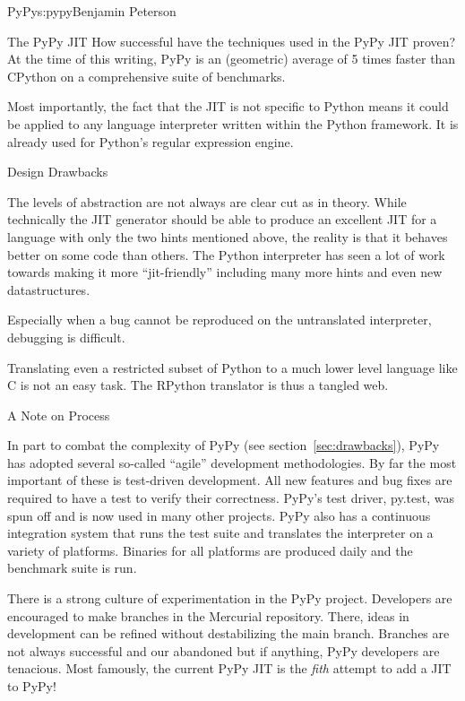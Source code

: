 \begin{aosachapter}{PyPy}{s:pypy}{Benjamin Peterson}
\begin{aosasect1}{The PyPy JIT}
How successful have the techniques used in the PyPy JIT proven? At the time of
this writing, PyPy is an (geometric) average of 5 times faster than CPython on a
comprehensive suite of benchmarks.

Most importantly, the fact that the JIT is not specific to Python means it could
be applied to any language interpreter written within the Python framework. It
is already used for Python's regular expression engine.

\end{aosasect1}

\begin{aosasect1}{Design Drawbacks}
\label{sec:drawbacks}

The levels of abstraction are not always are clear cut as in theory. While
technically the JIT generator should be able to produce an excellent JIT for a
language with only the two hints mentioned above, the reality is that it behaves
better on some code than others. The Python interpreter has seen a lot of work
towards making it more ``jit-friendly'' including many more hints and even new
datastructures.

Especially when a bug cannot be reproduced on the untranslated interpreter,
debugging is difficult.

Translating even a restricted subset of Python to a much lower level language
like C is not an easy task. The RPython translator is thus a tangled web.

\end{aosasect1}

\begin{aosasect1}{A Note on Process}

In part to combat the complexity of PyPy (see section~\ref{sec:drawbacks}), PyPy
has adopted several so-called ``agile'' development methodologies. By far the
most important of these is test-driven development. All new features and bug
fixes are required to have a test to verify their correctness. PyPy's test
driver, py.test, was spun off and is now used in many other projects. PyPy also
has a continuous integration system that runs the test suite and translates the
interpreter on a variety of platforms. Binaries for all platforms are produced
daily and the benchmark suite is run.

There is a strong culture of experimentation in the PyPy project. Developers are
encouraged to make branches in the Mercurial repository. There, ideas in
development can be refined without destabilizing the main branch. Branches are
not always successful and our abandoned but if anything, PyPy developers are
tenacious. Most famously, the current PyPy JIT is the \emph{fith} attempt to add
a JIT to PyPy!


\end{aosasect1}
\end{aosachapter}

